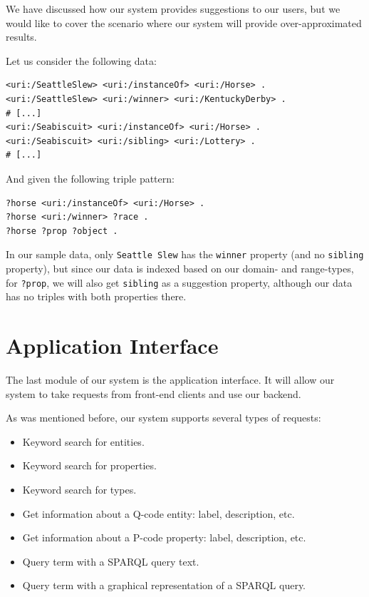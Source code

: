 We have discussed how our system provides suggestions to our users, but we would like to cover the scenario where our system will provide over-approximated results.

\begin{example}
Let us consider the following data:

\begin{verbatim}
<uri:/SeattleSlew> <uri:/instanceOf> <uri:/Horse> .
<uri:/SeattleSlew> <uri:/winner> <uri:/KentuckyDerby> .
# [...]
<uri:/Seabiscuit> <uri:/instanceOf> <uri:/Horse> .
<uri:/Seabiscuit> <uri:/sibling> <uri:/Lottery> .
# [...]
\end{verbatim}

And given the following triple pattern:
\begin{verbatim}
?horse <uri:/instanceOf> <uri:/Horse> .
?horse <uri:/winner> ?race .
?horse ?prop ?object .
\end{verbatim}


In our sample data, only \texttt{Seattle Slew} has the \texttt{winner} property (and no \texttt{sibling} property), but since our data is indexed based on our domain- and range-types, for \texttt{?prop}, we will also get \texttt{sibling} as a suggestion property, although our data has no triples with both properties there.

\end{example}


\section{Application Interface}
\label{chap:api}

The last module of our system is the application interface. It will allow our system to take requests from front-end clients and use our backend.

As was mentioned before, our system supports several types of requests:
\begin{itemize}
    \item Keyword search for entities.
    \item Keyword search for properties.
    \item Keyword search for types.
    \item Get information about a Q-code entity: label, description, etc.
    \item Get information about a P-code property: label, description, etc.
    \item Query term with a SPARQL query text.
    \item Query term with a graphical representation of a SPARQL query.
\end{itemize}

